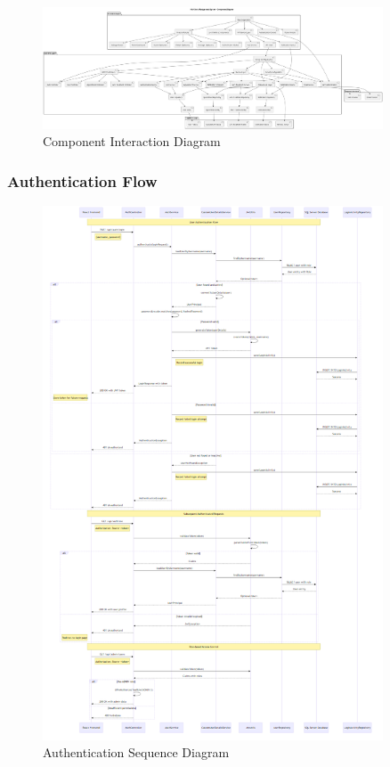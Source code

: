 \documentclass[12pt,a4paper]{article}
\begin{document}
\begin{figure}[H]
\centering
\includegraphics[width=0.9\textwidth]{diagrams/component_diagram}
\caption{Component Interaction Diagram}
\label{fig:component-diagram}
\end{figure}

\subsubsection{Authentication Flow}
\begin{figure}[H]
\centering
\includegraphics[width=0.9\textwidth]{diagrams/authentication_sequence}
\caption{Authentication Sequence Diagram}
\label{fig:authentication-sequence}
\end{figure}
\end{document}
